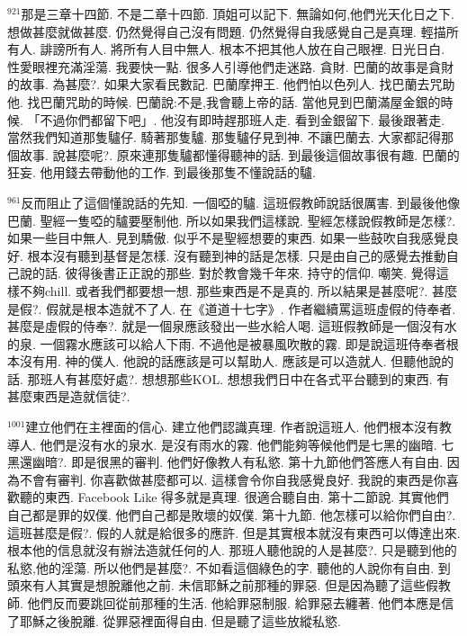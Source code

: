 \documentclass{book}
\begin{document}
$^{921}$那是三章十四節.
不是二章十四節.
頂姐可以記下.
無論如何,他們光天化日之下.
想做甚麼就做甚麼.
仍然覺得自己沒有問題.
仍然覺得自我感覺自己是真理.
輕描所有人.
誹謗所有人.
將所有人目中無人.
根本不把其他人放在自己眼裡.
日光日白.
性愛眼裡充滿淫蕩.
我要快一點.
很多人引導他們走迷路.
貪財.
巴蘭的故事是貪財的故事.
為甚麼?.
如果大家看民數記.
巴蘭摩押王.
他們怕以色列人.
找巴蘭去咒助他.
找巴蘭咒助的時候.
巴蘭說:不是,我會聽上帝的話.
當他見到巴蘭滿屋金銀的時候.
「不過你們都留下吧」.
他沒有即時趕那班人走.
看到金銀留下.
最後跟著走.
當然我們知道那隻驢仔.
騎著那隻驢.
那隻驢仔見到神.
不讓巴蘭去.
大家都記得那個故事.
說甚麼呢?.
原來連那隻驢都懂得聽神的話.
到最後這個故事很有趣.
巴蘭的狂妄.
他用錢去帶動他的工作.
到最後那隻不懂說話的驢.

$^{961}$反而阻止了這個懂說話的先知.
一個啞的驢.
這班假教師說話很厲害.
到最後他像巴蘭.
聖經一隻啞的驢要壓制他.
所以如果我們這樣說.
聖經怎樣說假教師是怎樣?.
如果一些目中無人.
見到驕傲.
似乎不是聖經想要的東西.
如果一些鼓吹自我感覺良好.
根本沒有聽到基督是怎樣.
沒有聽到神的話是怎樣.
只是由自己的感覺去推動自己說的話.
彼得後書正正說的那些.
對於教會幾千年來.
持守的信仰.
嘲笑.
覺得這樣不夠chill.
或者我們都要想一想.
那些東西是不是真的.
所以結果是甚麼呢?.
甚麼是假?.
假就是根本造就不了人.
在《道道十七字》.
作者繼續罵這班虛假的侍奉者.
甚麼是虛假的侍奉?.
就是一個泉應該發出一些水給人喝.
這班假教師是一個沒有水的泉.
一個霧水應該可以給人下雨.
不過他是被暴風吹散的霧.
即是說這班侍奉者根本沒有用.
神的僕人.
他說的話應該是可以幫助人.
應該是可以造就人.
但聽他說的話.
那班人有甚麼好處?.
想想那些KOL.
想想我們日中在各式平台聽到的東西.
有甚麼東西是造就信徒?.

$^{1001}$建立他們在主裡面的信心.
建立他們認識真理.
作者說這班人.
他們根本沒有教導人.
他們是沒有水的泉水.
是沒有雨水的霧.
他們能夠等候他們是七黑的幽暗.
七黑還幽暗?.
即是很黑的審判.
他們好像教人有私慾.
第十九節他們答應人有自由.
因為不會有審判.
你喜歡做甚麼都可以.
這樣會令你自我感覺良好.
我說的東西是你喜歡聽的東西.
Facebook Like 得多就是真理.
很適合聽自由.
第十二節說.
其實他們自己都是罪的奴僕.
他們自己都是敗壞的奴僕.
第十九節.
他怎樣可以給你們自由?.
這班甚麼是假?.
假的人就是給很多的應許.
但是其實根本就沒有東西可以傳達出來.
根本他的信息就沒有辦法造就任何的人.
那班人聽他說的人是甚麼?.
只是聽到他的私慾,他的淫蕩.
所以他們是甚麼?.
不如看這個綠色的字.
聽他的人說你有自由.
到頭來有人其實是想脫離他之前.
未信耶穌之前那種的罪惡.
但是因為聽了這些假教師.
他們反而要跳回從前那種的生活.
他給罪惡制服.
給罪惡去纏著.
他們本應是信了耶穌之後脫離.
從罪惡裡面得自由.
但是聽了這些放縱私慾.
\end{document}
